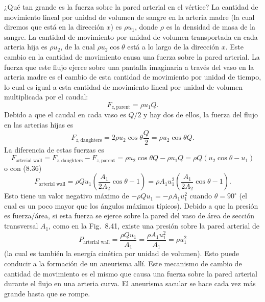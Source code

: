\documentclass[12pt]{book}
\begin{document}
¿Qué tan grande es la fuerza sobre la pared arterial en el vértice? La cantidad de movimiento lineal por unidad de volumen de sangre en la arteria madre (la cual diremos que está en la dirección $x$) es $\rho u_1$, donde $\rho$ es la densidad de masa de la sangre. La cantidad de movimiento por unidad de volumen transportada en cada arteria hija es $\rho u_2$, de la cual $\rho u_2 \cos\theta$ está a lo largo de la dirección $x$. Este cambio en la cantidad de movimiento causa una fuerza sobre la pared arterial. La fuerza que este flujo ejerce sobre una pantalla imaginaria a través del vaso en la arteria madre es el cambio de esta cantidad de movimiento por unidad de tiempo, lo cual es igual a esta cantidad de movimiento lineal por unidad de volumen multiplicada por el caudal:
\begin{equation}
F_{z,\text{parent}} = \rho u_1 Q.
\label{eq:837}
\end{equation}
Debido a que el caudal en cada vaso es $Q/2$ y hay dos de ellos, la fuerza del flujo en las arterias hijas es
\begin{equation}
F_{z,\text{daughters}} = 2 \rho u_2 \cos\theta \frac{Q}{2} = \rho u_2 \cos\theta Q.
\label{eq:838}
\end{equation}
La diferencia de estas fuerzas es
\begin{equation}
F_{\text{arterial wall}} = F_{z,\text{daughters}} - F_{z,\text{parent}} = \rho u_2 \cos\theta Q - \rho u_1 Q = \rho Q (u_2 \cos\theta - u_1)
\label{eq:839}
\end{equation}
o con (8.36)
\begin{equation}
F_{\text{arterial wall}} = \rho Q u_1 \left( \frac{A_1}{2 A_2} \cos\theta - 1 \right) = \rho A_1 u_1^2 \left( \frac{A_1}{2 A_2} \cos\theta - 1 \right).
\label{eq:840}
\end{equation}
Esto tiene un valor negativo máximo de $-\rho Q u_1 = -\rho A_1 u_1^2$ cuando $\theta = 90^\circ$ (el cual es un poco mayor que los ángulos máximos típicos). Debido a que la presión es fuerza/área, si esta fuerza se ejerce sobre la pared del vaso de área de sección transversal $A_1$, como en la Fig.~8.41, existe una presión sobre la pared arterial de
\begin{equation}
P_{\text{arterial wall}} = \frac{\rho Q u_1}{A_1} = \frac{\rho A_1 u_1^2}{A_1} = \rho u_1^2
\label{eq:841}
\end{equation}
(la cual es también la energía cinética por unidad de volumen). Esto puede conducir a la formación de un aneurisma allí. Este mecanismo de cambio de cantidad de movimiento es el mismo que causa una fuerza sobre la pared arterial durante el flujo en una arteria curva. El aneurisma sacular se hace cada vez más grande hasta que se rompe.
\end{document}
